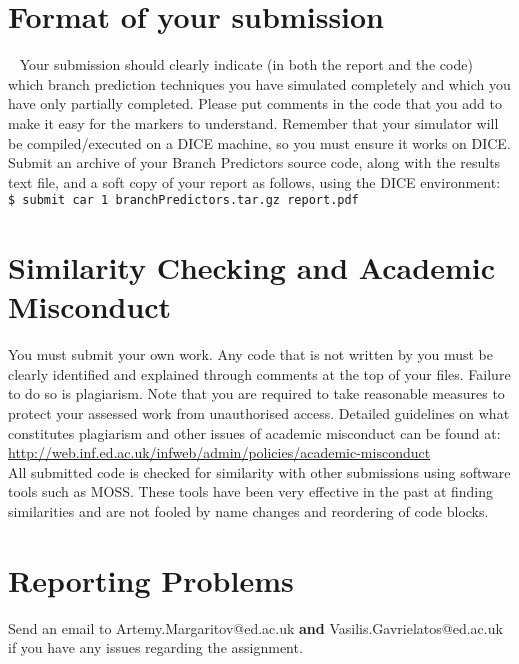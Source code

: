\documentclass[a4paper,12pt]{article}
\theoremstyle{plain}
\begin{document}
\section{Format of your submission} ~\label{instr}
Your submission should clearly indicate (in both the report and the code) which branch
prediction techniques you have simulated completely and which you have only partially
completed. Please put comments in the code that you add to make it easy for the
markers to understand. Remember that your simulator will be compiled/executed
on a DICE machine, so you must ensure it works on DICE.
Submit an archive of your Branch Predictors source code, along with the results text file, and a soft copy of your report as follows,
using the DICE environment:\\

\texttt{\$ submit car 1 branchPredictors.tar.gz report.pdf}

\section{Similarity Checking and Academic Misconduct}
You must submit your own work. Any code that is not written by you must be clearly identified and explained through comments at the top of your files. Failure to do so is plagiarism. Note that you are required to take reasonable measures to protect your assessed work from unauthorised access. Detailed guidelines on what constitutes plagiarism and other issues of academic misconduct can be found at: 
\vspace{0.05in}\\ 
\url{http://web.inf.ed.ac.uk/infweb/admin/policies/academic-misconduct}
\vspace{0.05in}\\
All submitted code is checked for similarity with other submissions using software tools such as MOSS. These tools have been very effective in the past at finding similarities and are not fooled by name changes and reordering of code blocks.


\section{Reporting Problems}
Send an email to Artemy.Margaritov@ed.ac.uk \textbf{and} Vasilis.Gavrielatos@ed.ac.uk if you have any issues
regarding the assignment.
\end{document}
